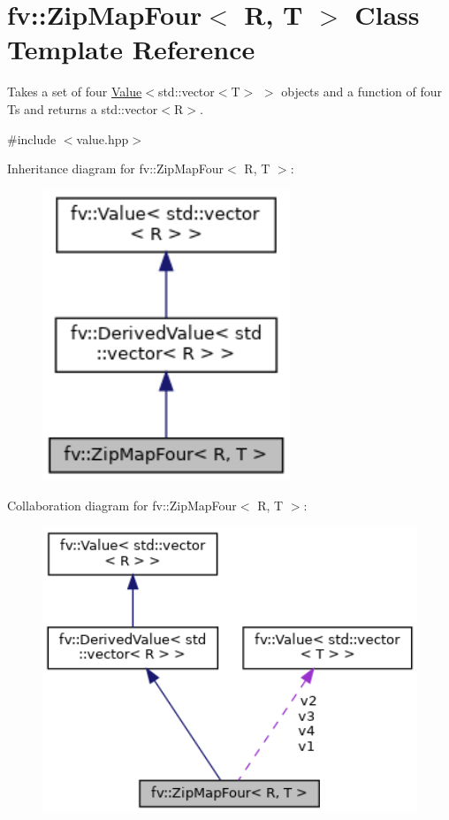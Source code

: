 \hypertarget{classfv_1_1ZipMapFour}{}\section{fv\+:\+:Zip\+Map\+Four$<$ R, T $>$ Class Template Reference}
\label{classfv_1_1ZipMapFour}


Takes a set of four \hyperlink{classfv_1_1Value}{Value}$<$std\+::vector$<$\+T$>$ $>$ objects and a function of four Ts and returns a std\+::vector$<$\+R$>$.  




{\ttfamily \#include $<$value.\+hpp$>$}



Inheritance diagram for fv\+:\+:Zip\+Map\+Four$<$ R, T $>$\+:
\nopagebreak
\begin{figure}[H]
\begin{center}
\leavevmode
\includegraphics[width=210pt]{classfv_1_1ZipMapFour__inherit__graph}
\end{center}
\end{figure}


Collaboration diagram for fv\+:\+:Zip\+Map\+Four$<$ R, T $>$\+:
\nopagebreak
\begin{figure}[H]
\begin{center}
\leavevmode
\includegraphics[width=350pt]{classfv_1_1ZipMapFour__coll__graph}
\end{center}
\end{figure}
